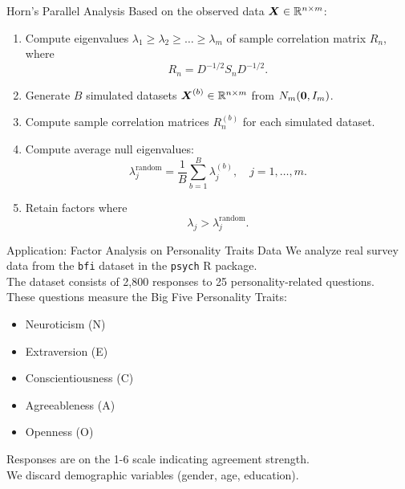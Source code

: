 \documentclass[11pt,handout,aspectratio=169]{beamer}
\begin{document}
\begin{frame}{Horn's Parallel Analysis}
Based on the observed data $\boldsymbol X\in \mathbb R^{n\times m}$:
  \begin{enumerate}
    \item Compute eigenvalues \( \lambda_1 \geq \lambda_2 \geq \dots \geq \lambda_m \) of sample correlation matrix \( R_n \), where
    \begin{equation}
      R_n = D^{-1/2} S_n D^{-1/2}.
    \end{equation}
    \item Generate \( B \) simulated datasets \(\boldsymbol X^{(b)} \in \mathbb{R}^{n \times m} \) from \( {N}_m(\boldsymbol 0,I_m) \).
    \item Compute sample correlation matrices \( R_n^{(b)} \) for each simulated dataset.
    \item Compute average null eigenvalues:
    \begin{equation}
      \lambda_j^{\text{random}} = \frac{1}{B} \sum_{b=1}^{B} \lambda_j^{(b)}, \quad j = 1, \dots, m.
    \end{equation}
    \item Retain factors where
    \begin{equation}
      \lambda_j > \lambda_j^{\text{random}}.
    \end{equation}
  \end{enumerate}
\end{frame}


\begin{frame}{Application: Factor Analysis on Personality Traits Data}
We analyze real survey data from the \texttt{bfi} dataset in the \texttt{psych} R package.\\[4mm]
The dataset consists of 2,800 responses to 25 personality-related questions.\\[4mm]
These questions measure the Big Five Personality Traits:
    \begin{itemize}
      \item Neuroticism (N)
      \item Extraversion (E)
      \item Conscientiousness (C)
      \item Agreeableness (A)
      \item Openness (O)
    \end{itemize}
Responses are on the 1-6 scale indicating agreement strength.\\[4mm]

We discard demographic variables (gender, age, education).
\end{frame}
\end{document}
